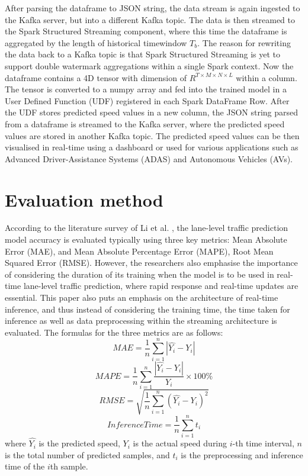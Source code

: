 \documentclass[11pt]{uonthesis}
\begin{document}
After parsing the dataframe to JSON string, the data stream is again ingested to the Kafka server, but into a different Kafka topic. The data is then streamed to the Spark Structured Streaming component, where this time the dataframe is aggregated by the length of historical timewindow $T_b$. The reason for rewriting the data back to a Kafka topic is that Spark Structured Streaming is yet to support double watermark aggregations within a single Spark context. Now the dataframe contains a 4D tensor with dimension of $R^{T{\times}M{\times}N{\times}L}$ within a column. The tensor is converted to a numpy array and fed into the trained model in a User Defined Function (UDF) registered in each Spark DataFrame Row. After the UDF stores predicted speed values in a new column, the JSON string parsed from a dataframe is streamed to the Kafka server, where the predicted speed values are stored in another Kafka topic. The predicted speed values can be then visualised in real-time using a dashboard or used for various applications such as Advanced Driver-Assistance Systems (ADAS) and Autonomous Vehicles (AVs). 

\section{Evaluation method}

According to the literature survey of Li et al. \cite{li2024unifyinglaneleveltrafficprediction}, the lane-level traffic prediction model accuracy is evaluated typically using three key metrics: Mean Absolute Error (MAE), and Mean Absolute Percentage Error (MAPE), Root Mean Squared Error (RMSE). However, the researchers also emphasise the importance of considering the duration of its training when the model is to be used in real-time lane-level traffic prediction, where rapid response and real-time updates are essential. This paper also puts an emphasis on the architecture of real-time inference, and thus instead of considering the training time, the time taken for inference as well as data preprocessing within the streaming architecture is evaluated. The formulas for the three metrics are as follows:
\[ MAE = \frac{1}{n}\sum_{i=1}^{n}|\hat{Y_i} - Y_i| \]
\[ MAPE = \frac{1}{n}\sum_{i=1}^{n}\frac{|\hat{Y_i} - Y_i|}{Y_i} \times 100\% \]
\[ RMSE = \sqrt{\frac{1}{n}\sum_{i=1}^{n}(\hat{Y_i} - Y_i)^2} \]
\[ Inference Time = \frac{1}{n}\sum_{i=1}^{n}t_i \]
where $\hat{Y_i}$ is the predicted speed, $Y_i$ is the actual speed during $i$-th time interval, $n$ is the total number of predicted samples, and $t_i$ is the preprocessing and inference time of the $i$th sample.
\end{document}
